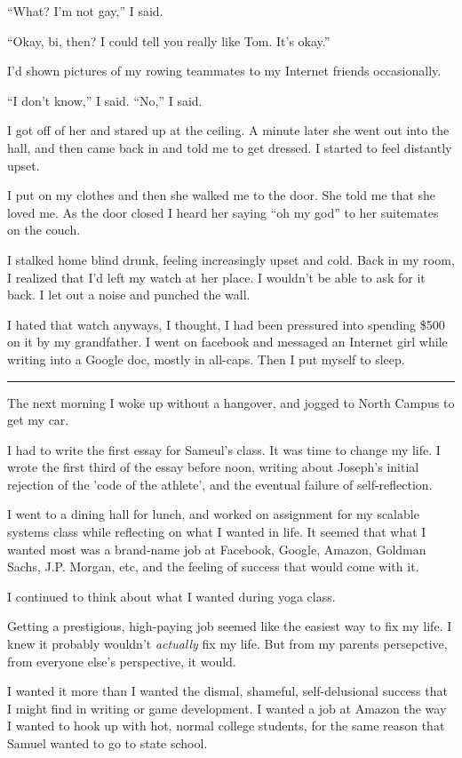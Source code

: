 ``What?  I'm not gay,'' I said.

``Okay, bi, then?  I could tell you really like Tom.  It's okay.''

I'd shown pictures of my rowing teammates to my Internet friends occasionally.

``I don't know,'' I said.  ``No,'' I said.

I got off of her and stared up at the ceiling.  A minute later she went out into
the hall, and then came back in and told me to get dressed.  I started to feel
distantly upset.

I put on my clothes and then she walked me to the door.  She told me that she
loved me.  As the door closed I heard her saying ``oh my god'' to her suitemates
on the couch.

I stalked home blind drunk, feeling increasingly upset and cold.  Back in my
room, I realized that I'd left my watch at her place.  I wouldn't be able to ask
for it back.  I let out a noise and punched the wall. 

I hated that watch anyways, I thought, I had been pressured into spending \$500
on it by my grandfather.  I went on facebook and messaged an Internet girl while
writing into a Google doc, mostly in all-caps.  Then I put myself to sleep.

\plainfancybreak{12pt}{2}{* * *}

The next morning I woke up without a hangover, and jogged to North Campus to get
my car.  

I had to write the first essay for Sameul's class. It was time to change my
life.  I wrote the first third of the essay before noon, writing about Joseph's
initial rejection of the 'code of the athlete', and the eventual failure of
self-reflection.

I went to a dining hall for lunch, and worked on assignment for my scalable
systems class while reflecting on what I wanted in life.  It seemed that what I
wanted most was a brand-name job at Facebook, Google, Amazon, Goldman Sachs,
J.P.  Morgan, etc, and the feeling of success that would come with it.  

I continued to think about what I wanted during yoga class.

Getting a prestigious, high-paying job seemed like the easiest way to fix my
life. I knew it probably wouldn't \textit{actually} fix my life.  But from my
parents persepctive, from everyone else's perspective, it would.  

I wanted it more than I wanted the dismal, shameful, self-delusional success
that I might find in writing or game development.  I wanted a job at Amazon the
way I wanted to hook up with hot, normal college students, for the same reason
that Samuel wanted to go to state school. 

